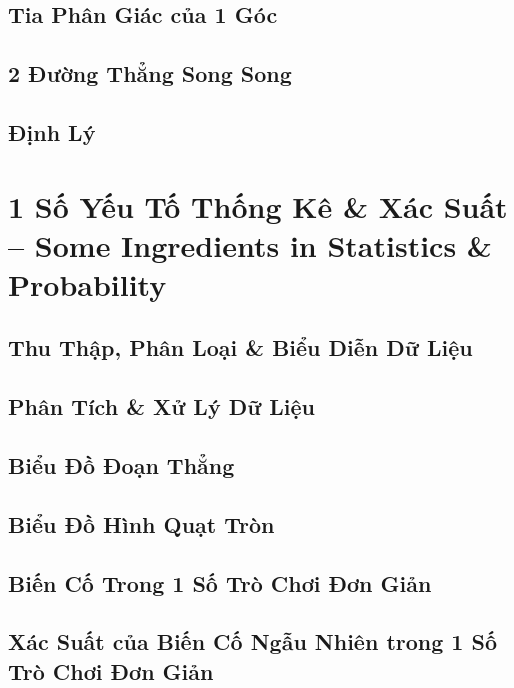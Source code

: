 \documentclass{article}
\numberwithin{equation}{section}
\begin{document}
\subsection{Tia Phân Giác của 1 Góc}

\subsection{2 Đường Thẳng Song Song}

\subsection{Định Lý}


\section{1 Số Yếu Tố Thống Kê \& Xác Suất -- Some Ingredients in Statistics \& Probability}

\subsection{Thu Thập, Phân Loại \& Biểu Diễn Dữ Liệu}

\subsection{Phân Tích \& Xử Lý Dữ Liệu}

\subsection{Biểu Đồ Đoạn Thẳng}

\subsection{Biểu Đồ Hình Quạt Tròn}

\subsection{Biến Cố Trong 1 Số Trò Chơi Đơn Giản}

\subsection{Xác Suất của Biến Cố Ngẫu Nhiên trong 1 Số Trò Chơi Đơn Giản}
\end{document}
